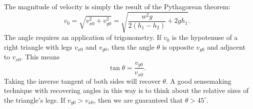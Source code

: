 \documentclass[]{article}
\begin{document}
The magnitude of velocity is simply the result of the Pythagorean theorem:
\begin{equation}
	v_{0} = \sqrt{v_{x0}^{2}+v_{y0}^{2}} = \sqrt{\frac{w^{2}g}{2(h_{1}-h_{2})} + 2gh_{1}}.
\end{equation}
The angle requires an application of trigonometry. If $ v_{0} $ is the hypotenuse of a right triangle with legs $ v_{x0} $ and $ v_{y0} $, then the angle $ \theta $ is opposite $ v_{y0} $ and adjacent to $ v_{x0} $. This means
\begin{equation}
	\tan\theta = \frac{v_{y0}}{v_{x0}}.
\end{equation}
Taking the inverse tangent of both sides will recover $ \theta $. A good sensemaking technique with recovering angles in this way is to think about the relative sizes of the triangle's legs. If $ v_{y0} > v_{x0} $, then we are guaranteed that $ \theta > 45^{\circ} $.
\end{document}

